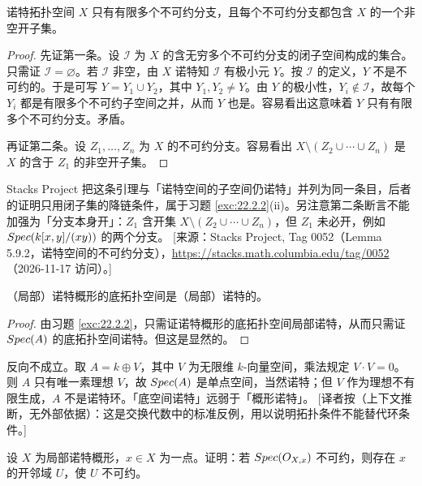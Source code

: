 \begin{lemma}\label{lem:22.2.3}
诺特拓扑空间 $X$ 只有有限多个不可约分支，且每个不可约分支都包含 $X$ 的一个非空开子集。
\end{lemma}

\begin{proof}
先证第一条。设 $\mathcal{I}$ 为 $X$ 的含无穷多个不可约分支的闭子空间构成的集合。只需证 $\mathcal{I} = \varnothing$。若 $\mathcal{I}$ 非空，由 $X$ 诺特知 $\mathcal{I}$ 有极小元 $Y$。按 $\mathcal{I}$ 的定义，$Y$ 不是不可约的。于是可写 $Y = Y_1 \cup Y_2$，其中 $Y_1, Y_2 \ne Y$。由 $Y$ 的极小性，$Y_i \notin \mathcal{I}$，故每个 $Y_i$ 都是有限多个不可约子空间之并，从而 $Y$ 也是。容易看出这意味着 $Y$ 只有有限多个不可约分支。矛盾。

再证第二条。设 $Z_1, \dots, Z_n$ 为 $X$ 的不可约分支。容易看出 $X \setminus (Z_2 \cup \cdots \cup Z_n)$ 是 $X$ 的含于 $Z_1$ 的非空开子集。
\end{proof}

\begin{yizhu}
Stacks Project 把这条引理与「诺特空间的子空间仍诺特」并列为同一条目，后者的证明只用闭子集的降链条件，属于习题 \ref{exc:22.2.2}(ii)。另注意第二条断言不能加强为「分支本身开」：$Z_1$ 含开集 $X \setminus (Z_2 \cup \cdots \cup Z_n)$，但 $Z_1$ 未必开，例如 $Spec(k[x,y]/(xy))$ 的两个分支。
[来源：Stacks Project, Tag 0052（Lemma 5.9.2，诺特空间的不可约分支），\url{https://stacks.math.columbia.edu/tag/0052}（2026-11-17 访问）。]
\end{yizhu}

\begin{lemma}\label{lem:22.2.4}
（局部）诺特概形的底拓扑空间是（局部）诺特的。
\end{lemma}

\begin{proof}
由习题 \ref{exc:22.2.2}，只需证诺特概形的底拓扑空间局部诺特，从而只需证 $Spec(A)$ 的底拓扑空间诺特。但这是显然的。
\end{proof}

\begin{yizhu}
反向不成立。取 $A = k \oplus V$，其中 $V$ 为无限维 $k$-向量空间，乘法规定 $V \cdot V = 0$。则 $A$ 只有唯一素理想 $V$，故 $Spec(A)$ 是单点空间，当然诺特；但 $V$ 作为理想不有限生成，$A$ 不是诺特环。「底空间诺特」远弱于「概形诺特」。
[译者按（上下文推断，无外部依据）：这是交换代数中的标准反例，用以说明拓扑条件不能替代环条件。]
\end{yizhu}

\begin{exercise}\label{exc:22.2.5}
设 $X$ 为局部诺特概形，$x \in X$ 为一点。证明：若 $Spec(O_{X,x})$ 不可约，则存在 $x$ 的开邻域 $U$，使 $U$ 不可约。
\end{exercise}

